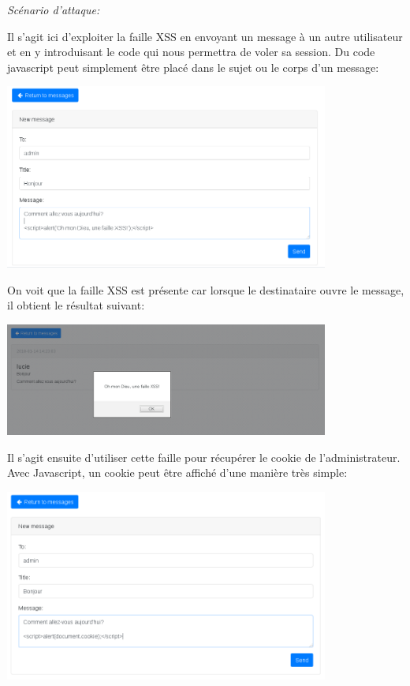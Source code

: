 \documentclass{article}
\begin{document}
\textit{Scénario d'attaque:}

Il s'agit ici d'exploiter la faille XSS en envoyant un message à un
autre utilisateur et en y introduisant le code qui nous permettra de
voler sa session. Du code javascript peut simplement être placé dans le
sujet ou le corps d'un message:

\begin{center}\includegraphics[width=0.8\textwidth]{images/xss1.png}\end{center}

On voit que la faille XSS est présente car lorsque le destinataire ouvre
le message, il obtient le résultat suivant:

\begin{center}\includegraphics[width=0.8\textwidth]{images/xss2.png}\end{center}

Il s'agit ensuite d'utiliser cette faille pour récupérer le cookie de
l'administrateur. Avec Javascript, un cookie peut être affiché d'une
manière très simple:

\begin{center}\includegraphics[width=0.8\textwidth]{images/xss3.png}\end{center}
\end{document}
